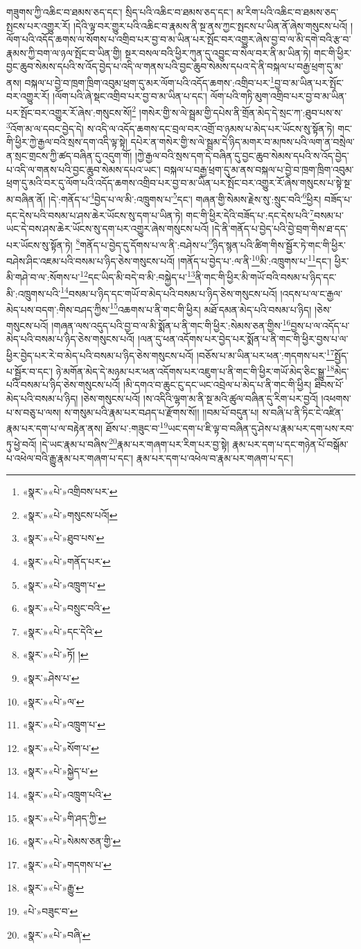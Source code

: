 གཟུགས་ཀྱི་འཆིང་བ་ཐམས་ཅད་དང་། སྲིད་པའི་འཆིང་བ་ཐམས་ཅད་དང་། མ་རིག་པའི་འཆིང་བ་ཐམས་ཅད་སྤངས་པར་འགྱུར་རོ། །དེའི་ལྟ་བར་གྱུར་པའི་འཆིང་བ་རྣམས་ནི་སྔ་ནས་ཀྱང་སྤངས་པ་ཡིན་ནོ་ཞེས་གསུངས་པའོ། །ལོག་པའི་འདོད་ཆགས་ལ་སོགས་པ་འགྲིབ་པར་བྱ་བ་མ་ཡིན་པར་སྤོང་བར་འགྱུར་ཞེས་བྱ་བ་ལ་མི་དགེ་བའི་རྩ་བ་རྣམས་ཀྱི་བག་ལ་ཉལ་སྤོང་བ་ཡིན་གྱི། སྔར་བསལ་བའི་ཕྱིར་ཀུན་དུ་འབྱུང་བ་སེལ་བར་ནི་མ་ཡིན་ཏེ། གང་གི་ཕྱིར་བྱང་ཆུབ་སེམས་དཔའི་ས་འོད་བྱེད་པ་འདི་ལ་གནས་པའི་བྱང་ཆུབ་སེམས་དཔའ་དེ་ནི་བསྐལ་པ་བརྒྱ་ཕྲག་དུ་མ་ནས། བསྐལ་པ་བྱེ་བ་ཁྲག་ཁྲིག་འབུམ་ཕྲག་དུ་མར་ལོག་པའི་འདོད་ཆགས་:འགྲིབ་པར་\footnote{«སྣར་»«པེ་»འགྲིབས་པར་}བྱ་བ་མ་ཡིན་པར་སྤོང་བར་འགྱུར་རོ། །ལོག་པའི་ཞེ་སྡང་འགྲིབ་པར་བྱ་བ་མ་ཡིན་པ་དང་། ལོག་པའི་གཏི་མུག་འགྲིབ་པར་བྱ་བ་མ་ཡིན་པར་སྤོང་བར་འགྱུར་རོ་ཞེས་:གསུངས་སོ།\footnote{«སྣར་»«པེ་»གསུངས་པའོ།} །གསེར་གྱི་ས་ལེ་སྦྲམ་གྱི་དཔེས་ནི་གྲོན་མེད་དེ་སྲང་ཀ་:ཐུབ་པས་ས་\footnote{«སྣར་»«པེ་»ཐུབ་པས་}འོག་མ་ལ་དབང་བྱེད་དེ། ས་འདི་ལ་འདོད་ཆགས་དང་བྲལ་བར་འགྲོ་བ་ཉམས་པ་མེད་པར་ཡོངས་སུ་སྟོན་ཏེ། གང་གི་ཕྱིར་ཀྱེ་རྒྱལ་བའི་སྲས་དག་འདི་ལྟ་སྟེ། དཔེར་ན་གསེར་གྱི་ས་ལེ་སྦྲམ་དེ་ཉིད་མགར་བ་མཁས་པའི་ལག་ན་བསྲེལ་ན་སྲང་གྲངས་ཀྱི་ཚད་བཞིན་དུ་འདུག་གོ། །ཀྱེ་རྒྱལ་བའི་སྲས་དག་དེ་བཞིན་དུ་བྱང་ཆུབ་སེམས་དཔའི་ས་འོད་བྱེད་པ་འདི་ལ་གནས་པའི་བྱང་ཆུབ་སེམས་དཔའ་ཡང་། བསྐལ་པ་བརྒྱ་ཕྲག་དུ་མ་ནས་བསྐལ་པ་བྱེ་བ་ཁྲག་ཁྲིག་འབུམ་ཕྲག་དུ་མའི་བར་དུ་ལོག་པའི་འདོད་ཆགས་འགྲིབ་པར་བྱ་བ་མ་ཡིན་པར་སྤོང་བར་འགྱུར་རོ་ཞེས་གསུངས་པ་སྟེ་སྔ་མ་བཞིན་ནོ། །དེ་:གནོད་པ་\footnote{«སྣར་»«པེ་»གནོད་པར་}བྱེད་པ་ལ་མི་:འཁྲུགས་པ་\footnote{«སྣར་»«པེ་»འཁྲུག་པ་}དང་། གཞན་གྱི་སེམས་རྗེས་སུ་:སྲུང་བའི་\footnote{«སྣར་»«པེ་»བསྲུང་བའི་}ཕྱིར། བཟོད་པ་དང་དེས་པའི་བསམ་པ་ཤས་ཆེར་ཡོངས་སུ་དག་པ་ཡིན་ཏེ། གང་གི་ཕྱིར་དེའི་བཟོད་པ་:དང་དེས་པའི་\footnote{«སྣར་»«པེ་»དང་དེའི་}བསམ་པ་ཡང་དེ་བས་ཤས་ཆེར་ཡོངས་སུ་དག་པར་འགྱུར་ཞེས་གསུངས་པའོ། །དེ་ནི་གནོད་པ་བྱེད་པའི་བྱེ་བྲག་གིས་ཐ་དད་པར་ཡོངས་སུ་སྟོན་ཏེ། \footnote{«སྣར་»«པེ་»ཏོ། ། }གནོད་པ་བྱེད་དུ་དོགས་པ་ལ་ནི་:བཤེས་པ་\footnote{«སྣར་»ཤེས་པ་}ཉིད་སྙན་པའི་ཚིག་གིས་སྦྱོར་ཏེ་གང་གི་ཕྱིར་བཤེས་ཤིང་འཇམ་པའི་བསམ་པ་ཉིད་ཅེས་གསུངས་པའོ། །གནོད་པ་བྱེད་པ་:ལ་ནི་\footnote{«སྣར་»«པེ་»ལ་}མི་:འཁྲུགས་པ་\footnote{«སྣར་»«པེ་»འཁྲུག་པ་}དང་། ཕྱིར་མི་གཤེ་བ་ལ་:སོགས་པ་\footnote{«སྣར་»«པེ་»སོག་པ་}དང་ཡིད་མི་བདེ་བ་མི་:བསྐྱེད་པ་\footnote{«སྣར་»«པེ་»སྐྱེད་པ་}ནི་གང་གི་ཕྱིར་མི་གཡོ་བའི་བསམ་པ་ཉིད་དང་མི་:འཁྲུགས་པའི་\footnote{«སྣར་»«པེ་»འཁྲུག་པའི་}བསམ་པ་ཉིད་དང་གཡོ་བ་མེད་པའི་བསམ་པ་ཉིད་ཅེས་གསུངས་པའོ། །འདས་པ་ལ་ང་རྒྱལ་མེད་པས་བདག་:གིས་བཤད་ཀྱིས་\footnote{«སྣར་»«པེ་»གི་ཤད་ཀྱི་}འཆགས་པ་ནི་གང་གི་ཕྱིར། མཐོ་དམན་མེད་པའི་བསམ་པ་ཉིད། །ཅེས་གསུངས་པའོ། །གཞན་ལས་འདུད་པའི་བྱ་བ་ལ་མི་སྨོན་པ་ནི་གང་གི་ཕྱིར་:སེམས་ཅན་གྱིས་\footnote{«སྣར་»«པེ་»སེམས་ཅན་གྱི་}བྱས་པ་ལ་འདོད་པ་མེད་པའི་བསམ་པ་ཉིད་ཅེས་གསུངས་པའོ། །ལན་དུ་ཕན་འདོགས་པར་བྱེད་པར་སྨོན་པ་ནི་གང་གི་ཕྱིར་བྱས་པ་ལ་ཕྱིར་བྱེད་པར་རེ་བ་མེད་པའི་བསམ་པ་ཉིད་ཅེས་གསུངས་པའོ། །བཅོས་པ་མ་ཡིན་པར་ཕན་:གདགས་པར་\footnote{«སྣར་»«པེ་»གདགས་པ་}སྤྱོད་པ་སྦྱོར་བ་དང་། ཉེ་མགོན་མེད་དེ་མཉམ་པར་ཕན་འདོགས་པར་འཇུག་པ་ནི་གང་གི་ཕྱིར་གཡོ་མེད་ཅིང་སྒྱུ་\footnote{«སྣར་»«པེ་»རྒྱུ་}མེད་པའི་བསམ་པ་ཉིད་ཅེས་གསུངས་པའོ། །མི་དགའ་བ་ཆུང་ངུ་དང་ཡང་འབྲེལ་པ་མེད་པ་ནི་གང་གི་ཕྱིར། ཐིབས་པོ་མེད་པའི་བསམ་པ་ཉིད། །ཅེས་གསུངས་པའོ། །ས་འདིའི་ལྷག་མ་ནི་སྔ་མའི་ཚུལ་བཞིན་དུ་རིག་པར་བྱའོ། །འཕགས་པ་ས་བཅུ་པ་ལས། ས་གསུམ་པའི་རྣམ་པར་བཤད་པ་རྫོགས་སོ།། །།བམ་པོ་བདུན་པ། ས་བཞི་པ་ནི་ཏིང་ངེ་འཛིན་རྣམ་པར་དག་པ་ལ་བརྟེན་ནས། ཐོས་པ་:གཟུང་བ་\footnote{«པེ་»བཟུང་བ་}ཡང་དག་པ་ཇི་ལྟ་བ་བཞིན་དུ་ཤེས་པ་རྣམ་པར་དག་པས་རབ་ཏུ་ཕྱེ་བའོ། །དེ་ཡང་རྣམ་པ་བཞིས་\footnote{«སྣར་»«པེ་»བཞི་}རྣམ་པར་གཞག་པར་རིག་པར་བྱ་སྟེ། རྣམ་པར་དག་པ་དང་གཉེན་པོ་བསྒོམ་པ་འཕེལ་བའི་རྒྱུ་རྣམ་པར་གཞག་པ་དང་། རྣམ་པར་དག་པ་འཕེལ་བ་རྣམ་པར་གཞག་པ་དང་། 